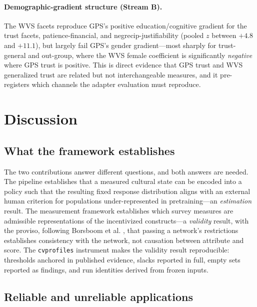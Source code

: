 \documentclass[11pt,letterpaper]{article}
\newcommand{\cvp}{\texttt{cvprofiles}}
\begin{document}
\paragraph{Demographic-gradient structure (Stream B).}
The WVS facets reproduce GPS's positive education/cognitive gradient for the trust facets, patience-financial, and negrecip-justifiability (pooled $z$ between $+4.8$ and $+11.1$), but largely fail GPS's gender gradient---most sharply for trust-general and out-group, where the WVS female coefficient is significantly \emph{negative} where GPS trust is positive. This is direct evidence that GPS trust and WVS generalized trust are related but not interchangeable measures, and it pre-registers which channels the adapter evaluation must reproduce.

\section{Discussion}

\subsection{What the framework establishes}

The two contributions answer different questions, and both answers are needed. The pipeline establishes that a measured cultural state can be encoded into a policy such that the resulting fixed response distribution aligns with an external human criterion for populations under-represented in pretraining---an \emph{estimation} result. The measurement framework establishes which survey measures are admissible representations of the incentivized constructs---a \emph{validity} result, with the proviso, following Borsboom et al. \cite{borsboom2004}, that passing a network's restrictions establishes consistency with the network, not causation between attribute and score. The \cvp{} instrument makes the validity result reproducible: thresholds anchored in published evidence, slacks reported in full, empty sets reported as findings, and run identities derived from frozen inputs.

\subsection{Reliable and unreliable applications}
\end{document}
